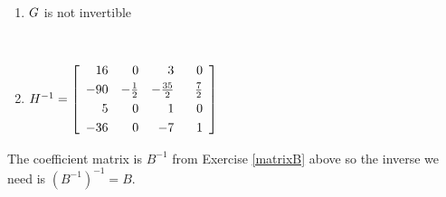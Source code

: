 \begin{multicols}{2} 
\begin{enumerate}
\setcounter{enumi}{\value{HW}}

\item $G \vphantom{\left[ \begin{array}{rrrr} 16 & 0 & 3 & 0 \\[3pt] -90 & -\frac{1}{2} & -\frac{35}{2} & \frac{7}{2} \\[3pt] 5 & 0 & 1 & 0 \\[3pt] -36 & 0 & -7 & \hphantom{-}1 \end{array} \right]}$ is not invertible
\item $H^{-1} = \left[ \begin{array}{rrrr} 16 & 0 & 3 & 0 \\[3pt] -90 & -\frac{1}{2} & -\frac{35}{2} & \frac{7}{2} \\[3pt] 5 & 0 & 1 & 0 \\[3pt] -36 & 0 & -7 & \hphantom{-}1 \end{array} \right]$

\setcounter{HW}{\value{enumi}}
\end{enumerate}
\end{multicols}

The coefficient matrix is $B^{-1}$ from Exercise \ref{matrixB} above so the inverse we need is $(B^{-1})^{-1} = B$. 


